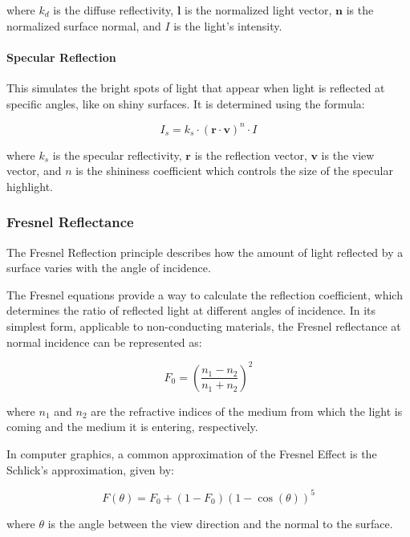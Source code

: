 where $k_d$ is the diffuse reflectivity, $\mathbf{l}$ is the normalized light vector, $\mathbf{n}$ is the normalized surface normal, and $I$ is the light's intensity.
    
\paragraph{Specular Reflection} This simulates the bright spots of light that appear when light is reflected at specific angles, like on shiny surfaces. It is determined using the formula: 

\begin{equation}
\label{specular}
I_s = k_s \cdot (\mathbf{r} \cdot \mathbf{v})^n \cdot I
\end{equation}

where $k_s$ is the specular reflectivity, $\mathbf{r}$ is the reflection vector, $\mathbf{v}$ is the view vector, and $n$ is the shininess coefficient which controls the size of the specular highlight.

\subsubsection{Fresnel Reflectance}
\label{Fresnel}

The Fresnel Reflection principle describes how the amount of light reflected by a surface varies with the angle of incidence. 

The Fresnel equations provide a way to calculate the reflection coefficient, which determines the ratio of reflected light at different angles of incidence. In its simplest form, applicable to non-conducting materials, the Fresnel reflectance at normal incidence can be represented as:

\begin{equation}
F_0 = \left( \frac{n_1 - n_2}{n_1 + n_2} \right)^2
\end{equation}

where $n_1$ and  $n_2$ are the refractive indices of the medium from which the light is coming and the medium it is entering, respectively.

In computer graphics, a common approximation of the Fresnel Effect is the Schlick's approximation, given by:

\begin{equation}
\label{schlick}
F(\theta) = F_0 + (1 - F_0)(1 - \cos(\theta))^5
\end{equation}

where $\theta$  is the angle between the view direction and the normal to the surface.

